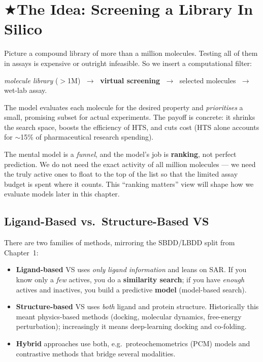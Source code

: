 \documentclass[11pt, oneside]{book}
\makeatletter
\newcommand{\starglyph}{\textcolor{stargold}{\ensuremath{\bigstar}}}
\newcommand{\starsec}[1]{%
  \texorpdfstring{\starglyph\hspace{0.4em}\textcolor{star@frame}{#1}}{#1}}
\makeatother
\begin{document}
\section{\starsec{The Idea: Screening a Library In Silico}}

Picture a compound library of more than a million molecules. Testing all of them
in assays is expensive or outright infeasible. So we insert a computational filter:

\begin{center}
\emph{molecule library} ($>$1M) $\;\to\;$ \textbf{virtual screening}
$\;\to\;$ selected molecules $\;\to\;$ wet-lab assay.
\end{center}

The model evaluates each molecule for the desired property and \emph{prioritises}
a small, promising subset for actual experiments. The payoff is concrete: it
shrinks the search space, boosts the efficiency of HTS, and cuts cost
(HTS alone accounts for $\sim$15\% of pharmaceutical research spending).

\begin{intbox}
The mental model is a \emph{funnel}, and the model's job is \textbf{ranking}, not
perfect prediction. We do not need the exact activity of all million molecules ---
we need the truly active ones to float to the top of the list so that the limited
assay budget is spent where it counts. This ``ranking matters'' view will shape
how we evaluate models later in this chapter.
\end{intbox}

\subsection{Ligand-Based vs.\ Structure-Based VS}

There are two families of methods, mirroring the SBDD/LBDD split from
Chapter~1:

\begin{itemize}
  \item \textbf{Ligand-based} VS uses \emph{only ligand information} and leans on
        SAR. If you know only a \emph{few} actives, you do a \textbf{similarity
        search}; if you have \emph{enough} actives and inactives, you build a
        predictive \textbf{model} (model-based search).
  \item \textbf{Structure-based} VS uses \emph{both} ligand and protein structure.
        Historically this meant physics-based methods (docking, molecular dynamics,
        free-energy perturbation); increasingly it means deep-learning docking and
        co-folding.
  \item \textbf{Hybrid} approaches use both, e.g.\ proteochemometrics (PCM) models
        and contrastive methods that bridge several modalities.
\end{itemize}
\end{document}
